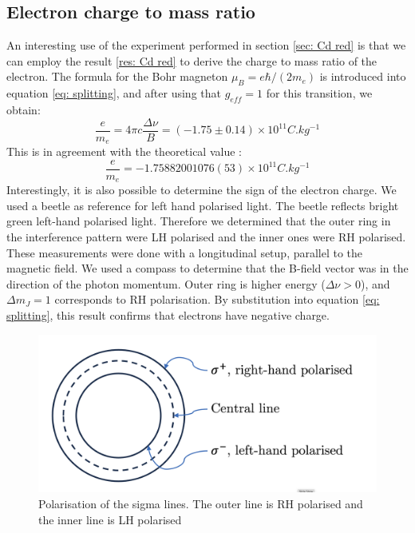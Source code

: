 \documentclass[11pt]{article}
\begin{document}
\subsection{Electron charge to mass ratio} \label{sec: e/m ratio}
An interesting use of the experiment performed in section \ref{sec: Cd red} is that we can employ the result \eqref{res: Cd red} to derive the charge to mass ratio of the electron. The formula for the Bohr magneton $\mu_B = e \hbar / (2 m_e)$ is introduced into equation \eqref{eq: splitting}, and after using that $g_{eff} = 1$ for this transition, we obtain: 
\begin{equation}
    \frac{e}{m_e} = 4 \pi c \frac{\Delta \nu}{B} = (-1.75 \pm 0.14) \times 10^{11} \si{C.kg^{-1}}
\end{equation}
This is in agreement with the theoretical value \cite{CODATA2018}: 
\begin{equation}
    \frac{e}{m_e} = -1.75882001076(53) \times 10^{11} \si{C.kg^{-1}}
\end{equation}
Interestingly, it is also possible to determine the sign of the electron charge. We used a beetle as reference for left hand polarised light. The beetle reflects bright green left-hand polarised light. Therefore we determined that the outer ring in the interference pattern were LH polarised and the inner ones were RH polarised. These measurements were done with a longitudinal setup, parallel to the magnetic field. We used a compass to determine that the B-field vector was in the direction of the photon momentum. Outer ring is higher energy ($\Delta \nu > 0$), and $ \Delta m_J = 1$ corresponds to RH polarisation. By substitution into equation \eqref{eq: splitting}, this result confirms that electrons have negative charge. 
\begin{figure}[h!]
    \centering
    \includegraphics[width=0.5\linewidth]{polarisation.png}
    \captionsetup{justification=centering}
    \captionsetup{width=\linewidth}
    \caption{Polarisation of the sigma lines. The outer line is RH polarised and the inner line is LH polarised}
    \label{fig: polarisation}
\end{figure}
\end{document}
